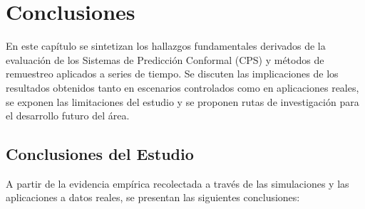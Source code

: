 \chapter{Conclusiones}
\label{cap:conclusiones}

En este capítulo se sintetizan los hallazgos fundamentales derivados de la evaluación de los Sistemas de Predicción Conformal (CPS) y métodos de remuestreo aplicados a series de tiempo. Se discuten las implicaciones de los resultados obtenidos tanto en escenarios controlados como en aplicaciones reales, se exponen las limitaciones del estudio y se proponen rutas de investigación para el desarrollo futuro del área.

\section{Conclusiones del Estudio}

A partir de la evidencia empírica recolectada a través de las simulaciones y las aplicaciones a datos reales, se presentan las siguientes conclusiones:

